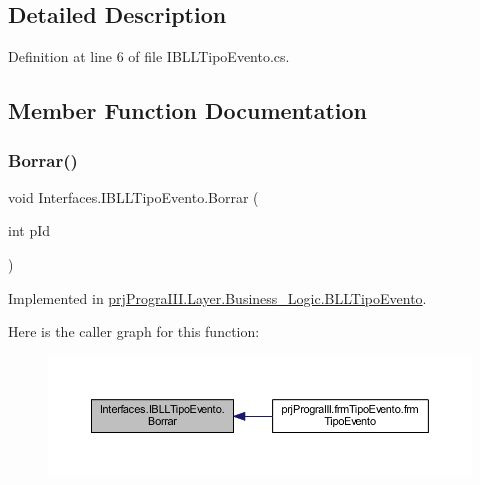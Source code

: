 \subsection{Detailed Description}


Definition at line 6 of file I\+B\+L\+L\+Tipo\+Evento.\+cs.



\subsection{Member Function Documentation}
\hypertarget{interface_interfaces_1_1_i_b_l_l_tipo_evento_a6ef15f72eee8239388905aed3c4d3ad5}{}\label{interface_interfaces_1_1_i_b_l_l_tipo_evento_a6ef15f72eee8239388905aed3c4d3ad5} 
\subsubsection{\texorpdfstring{Borrar()}{Borrar()}}
{\footnotesize\ttfamily void Interfaces.\+I\+B\+L\+L\+Tipo\+Evento.\+Borrar (\begin{DoxyParamCaption}\item[{int}]{p\+Id }\end{DoxyParamCaption})}



Implemented in \hyperlink{classprj_progra_i_i_i_1_1_layer_1_1_business___logic_1_1_b_l_l_tipo_evento_aaaccacb75f0020bbedee9a98c79d4899}{prj\+Progra\+I\+I\+I.\+Layer.\+Business\+\_\+\+Logic.\+B\+L\+L\+Tipo\+Evento}.

Here is the caller graph for this function\+:
\nopagebreak
\begin{figure}[H]
\begin{center}
\leavevmode
\includegraphics[width=350pt]{interface_interfaces_1_1_i_b_l_l_tipo_evento_a6ef15f72eee8239388905aed3c4d3ad5_icgraph}
\end{center}
\end{figure}
\hypertarget{interface_interfaces_1_1_i_b_l_l_tipo_evento_afa587820875ec8c611cb628c33a3a274}{}\label{interface_interfaces_1_1_i_b_l_l_tipo_evento_afa587820875ec8c611cb628c33a3a274} 
